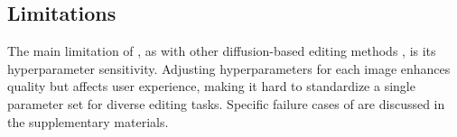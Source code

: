 \subsection{Limitations}
\label{sec:limitations}


The main limitation of \method{}, as {\modified{}with} other diffusion-based editing methods \cite{han2023proximal}, is its hyperparameter sensitivity. Adjusting hyperparameters for each image enhances quality but affects user experience, making it hard to standardize a single parameter set for diverse editing tasks. {\modified{}Specific failure cases} of \method{} are discussed in the supplementary materials.

